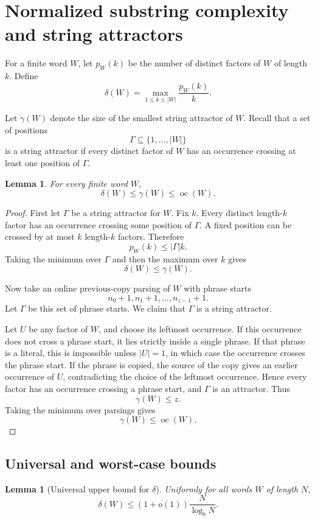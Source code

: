 \documentclass[11pt]{amsart}
\newtheorem{lemma}[theorem]{Lemma}
\DeclareMathOperator{\oc}{oc}
\begin{document}
\section{Normalized substring complexity and string attractors}

For a finite word $W$, let $p_W(k)$ be the number of distinct factors of $W$ of length $k$. Define
\[
\delta(W)=\max_{1\leq k\leq |W|}\frac{p_W(k)}{k}.
\]

Let $\gamma(W)$ denote the size of the smallest string attractor of $W$. Recall that a set of positions
\[
\Gamma\subseteq\{1,\ldots,|W|\}
\]
is a string attractor if every distinct factor of $W$ has an occurrence crossing at least one position of $\Gamma$.

\begin{lemma}
For every finite word $W$,
\[
\delta(W)\leq \gamma(W)\leq \oc(W).
\]
\end{lemma}

\begin{proof}
First let $\Gamma$ be a string attractor for $W$. Fix $k$. Every distinct length-$k$ factor has an occurrence crossing some position of $\Gamma$. A fixed position can be crossed by at most $k$ length-$k$ factors. Therefore
\[
p_W(k)\leq |\Gamma|k.
\]
Taking the minimum over $\Gamma$ and then the maximum over $k$ gives
\[
\delta(W)\leq \gamma(W).
\]

Now take an online previous-copy parsing of $W$ with phrase starts
\[
n_0+1,n_1+1,\ldots,n_{z-1}+1.
\]
Let $\Gamma$ be this set of phrase starts. We claim that $\Gamma$ is a string attractor.

Let $U$ be any factor of $W$, and choose its leftmost occurrence. If this occurrence does not cross a phrase start, it lies strictly inside a single phrase. If that phrase is a literal, this is impossible unless $|U|=1$, in which case the occurrence crosses the phrase start. If the phrase is copied, the source of the copy gives an earlier occurrence of $U$, contradicting the choice of the leftmost occurrence. Hence every factor has an occurrence crossing a phrase start, and $\Gamma$ is an attractor. Thus
\[
\gamma(W)\leq z.
\]
Taking the minimum over parsings gives
\[
\gamma(W)\leq \oc(W).
\]
\end{proof}

\subsection{Universal and worst-case bounds}

\begin{lemma}[Universal upper bound for $\delta$]
Uniformly for all words $W$ of length $N$,
\[
\delta(W)
\leq
(1+o(1))\frac{N}{\log_b N}.
\]
\end{lemma}
\end{document}
